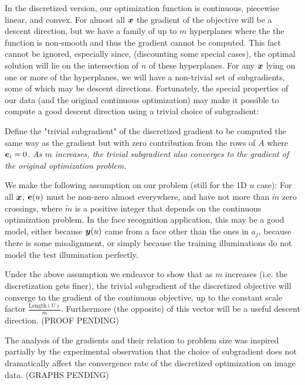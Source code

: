 \documentclass[12pt,journal,draftcls,letterpaper,onecolumn]{IEEEtran}
\begin{document}
In the discretized version, our optimization function is continuous, piecewise linear, and convex.  For almost all ${\boldsymbol{x}}$ the gradient of the objective will be a descent direction, but we have a family of up to $m$ hyperplanes where the the function is non-smooth and thus the gradient cannot be computed.  This fact cannot be ignored, especially since, (discounting some special cases), the optimal solution will lie on the intersection of $n$ of these hyperplanes.  For any ${\boldsymbol{x}}$ lying on one or more of the hyperplanes, we will have a non-trivial set of subgradients, some of which may be descent directions.  Fortunately, the special properties of our data (and the original continuous optimization) may make it possible to compute a good descent direction using a trivial choice of subgradient:

Define the "trivial subgradient" of the discretized gradient to be computed the same way as the gradient but with zero contribution from the rows of $A$ where $\boldsymbol{e}_i=0$. {\em As $m$ increases, the trivial subgradient also converges to the gradient of the original optimization problem.} 

We make the following assumption on our problem (still for the 1D $u$ case):  For all ${\boldsymbol{x}}$, $\boldsymbol{e}(u)$ must be non-zero almost everywhere, and have not more than $\tilde m$ zero crossings, where $\tilde m$ is a positive integer that depends on the continuous optimization problem.  In the face recognition application, this may be a good model, either because ${\boldsymbol{y}}(u)$ came from a face other than the ones in $a_j$, because there is some misalignment, or simply because the training illuminations do not model the test illumination perfectly.

Under the above assumption we endeavor to show that as $m$ increases (i.e. the discretization gets finer), the trivial subgradient of the discretized objective will converge to the gradient of the continuous objective, up to the constant scale factor $\frac{\textrm{Length}(U)}{m}$.  Furthermore (the opposite) of this vector will be a useful descent direction.  (PROOF PENDING)

The analysis of the gradients and their relation to problem size was inspired partially by the experimental observation that the choice of subgradient does not dramatically affect the convergence rate of the discretized optimization on image data. (GRAPHS PENDING)


\end{document}
